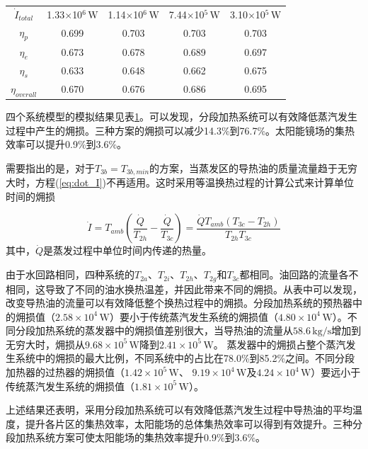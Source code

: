 \begin{table}[htbp]
\begin{center}
\begin{tabular}{ccccc}
		$\dot{I}_{total}$    &    1.33$\times$10$^6\,\mathrm{W}$    &  1.14$\times$10$^6\,\mathrm{W}$  &	7.44$\times$10$^5\,\mathrm{W}$	&	3.10$\times$10$^5\,\mathrm{W}$\\
		$\eta_p$    &    0.699    &	0.703	&    0.703	&	0.703\\
		$\eta_e$    &    0.673    &	0.678	& 0.689	&	0.697\\
		$\eta_s$    &    0.633    &  0.648	&  0.662	&	0.675\\
		$\eta_{overall}$    &    0.670   &	0.676	&    0.686	&	0.695\\
		\bottomrule
	\end{tabular}
	\end{center}
	\label{tab:comparison}
\end{table}

四个系统模型的模拟结果见表\ref{tab:comparison}。可以发现，分段加热系统可以有效降低蒸汽发生过程中产生的㶲损。三种方案的㶲损可以减少14.3\%到76.7\%。太阳能镜场的集热效率可以提升0.9\%到3.6\%。

需要指出的是，对于$T_{3b} = T_{3b,min}$的方案，当蒸发区的导热油的质量流量趋于无穷大时，方程(\ref{eq:dot_I})不再适用。这时采用等温换热过程的计算公式来计算单位时间的㶲损

\begin{equation}
  \dot{I} = T_{amb} (\frac{\dot{Q}}{T_{2h}} - \frac{\dot{Q}}{T_{3c}}) = \frac{\dot{Q}T_{amb}(T_{3c} - T_{2h})}{T_{2h}T_{3c}}
  \label{eq:isothermal}
\end{equation}
其中，$\dot{Q}$是蒸发过程中单位时间内传递的热量。

由于水回路相同，四种系统的$T_{2a}$、$T_{2i}$、$T_{2h}$、$T_{2g}$和$T_{3c}$都相同。油回路的流量各不相同，这导致了不同的油水换热温差，并因此带来不同的㶲损。从表中可以发现，改变导热油的流量可以有效降低整个换热过程中的㶲损。分段加热系统的预热器中的㶲损值（$2.58\times 10^4\,\mathrm{W}$）要小于传统蒸汽发生系统的㶲损值（$4.80\times10^4\,\mathrm{W}$）。不同分段加热系统的蒸发器中的㶲损值差别很大，当导热油的流量从$58.6\,\mathrm{kg/s}$增加到无穷大时，㶲损从$9.68\times10^5\,\mathrm{W}$降到$2.41\times10^5\,\mathrm{W}$。
蒸发器中的㶲损占整个蒸汽发生系统中的㶲损的最大比例，不同系统中的占比在78.0\%到85.2\%之间。不同分段加热器的过热器的㶲损值（$1.42\times 10^5\,\mathrm{W}$、 $9.19\times 10^4\,\mathrm{W}$及$4.24\times 10^4\,\mathrm{W}$）要远小于传统蒸汽发生系统的㶲损值（$1.81\times10^5\,\mathrm{W}$）。

上述结果还表明，采用分段加热系统可以有效降低蒸汽发生过程中导热油的平均温度，提升各片区的集热效率，太阳能场的总体集热效率可以得到有效提升。三种分段加热系统方案可使太阳能场的集热效率提升0.9\%到3.6\%。

